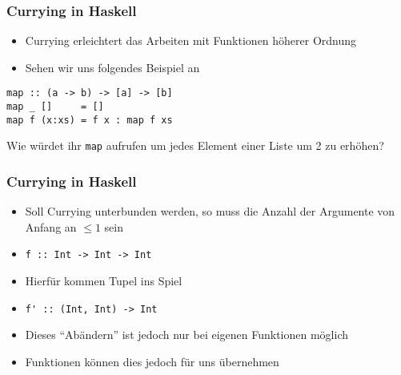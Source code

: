 \documentclass[fleqn,11pt,aspectratio=43]{beamer}
\begin{document}
\begin{frame}[fragile]
\frametitle{Currying in Haskell}
\begin{block}{\vspace*{-3ex}}
\begin{itemize}
  \item Currying erleichtert das Arbeiten mit Funktionen höherer Ordnung
  \item Sehen wir uns folgendes Beispiel an
\end{itemize}
\end{block}
\begin{lstlisting}
map :: (a -> b) -> [a] -> [b]
map _ []     = []
map f (x:xs) = f x : map f xs
\end{lstlisting}
\begin{block}{Wie würdet ihr \lstinline|map| aufrufen um jedes Element einer Liste um 2 zu erhöhen?}
\end{block}
\end{frame}

\begin{frame}
\frametitle{Currying in Haskell}
\begin{block}{\vspace*{-3ex}}
\begin{itemize}
  \item Soll Currying unterbunden werden, so muss die Anzahl der Argumente von Anfang an $\leq 1$ sein
  \item <1-3> \lstinline|f :: Int -> Int -> Int|
  \item <1-3> Hierfür kommen Tupel ins Spiel
  \item <2-3> \lstinline|f' :: (Int, Int) -> Int|
  \item <2-3> Dieses "`Abändern"' ist jedoch nur bei eigenen Funktionen möglich
  \item <3> Funktionen können dies jedoch für uns übernehmen
\end{itemize}
\end{block}
\end{frame}
\end{document}
